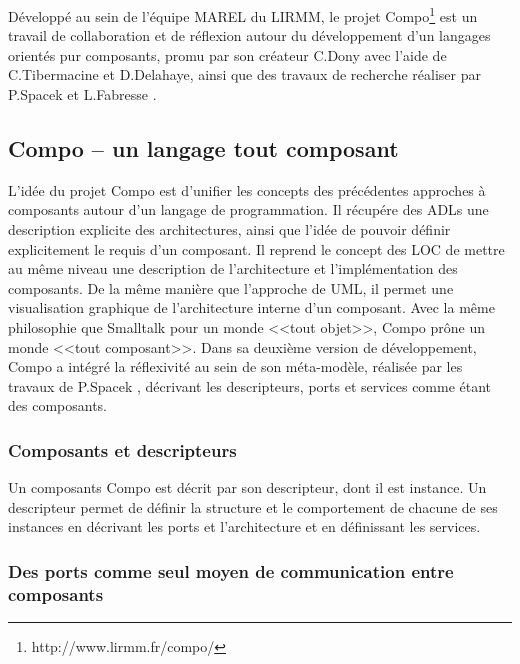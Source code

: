     
    \label{sec:compo} 

    Développé au sein de l'équipe MAREL du LIRMM, le projet Compo\footnote{http://www.lirmm.fr/compo/} est un travail de collaboration et de réflexion autour du développement d'un langages orientés pur composants, promu par son créateur C.Dony avec l'aide de C.Tibermacine et D.Delahaye, ainsi que des travaux de recherche réaliser par P.Spacek \cite{Spacek:2014:CMA:2602458.2602476} et L.Fabresse \cite{fabresse2007decoupage}.
    
    \subsection{Compo -- un langage tout composant}
    
L'idée du projet Compo est d'unifier les concepts des précédentes approches à composants autour d'un langage de programmation. Il récupére des ADLs une description explicite des architectures, ainsi que l'idée de pouvoir définir explicitement le requis d'un composant. Il reprend le concept des LOC de mettre au même niveau une description de l'architecture et l'implémentation des composants. De la même manière que l'approche de UML, il permet une visualisation graphique de l'architecture interne d'un composant. Avec la même philosophie que Smalltalk pour un monde <<tout objet>>, Compo prône un monde <<tout composant>>. Dans sa deuxième version de développement, Compo a intégré la réflexivité au sein de son méta-modèle, réalisée par les travaux de P.Spacek \cite{Spacek:2014:CMA:2602458.2602476}, décrivant les descripteurs, ports et services comme étant des composants. 
  
      \subsubsection{Composants et descripteurs}
    
    Un composants Compo est décrit par son descripteur, dont il est instance. Un descripteur permet de définir la structure et le comportement de chacune de ses instances en décrivant les ports et l'architecture et en définissant les services. 
    
      \subsubsection{Des ports comme seul moyen de communication entre composants}
      
